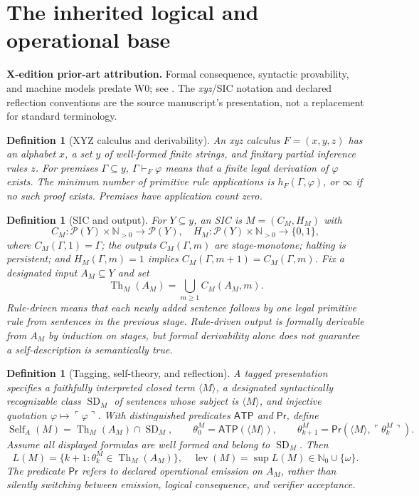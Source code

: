 \documentclass[11pt,letterpaper]{article}
\newcommand{\PriorArtNote}[1]{%
\par\smallskip\noindent\begin{minipage}{\linewidth}\small\color{black!85}%
\textbf{X-edition prior-art attribution.} #1\end{minipage}\par\smallskip}
\newtheorem{definition}[theorem]{Definition}
\newcommand{\thmset}{\operatorname{Th}}
\newcommand{\Self}{\operatorname{Self}}
\newcommand{\SD}{\operatorname{SD}}
\newcommand{\Prv}{\mathsf{Pr}}
\newcommand{\ATP}{\mathsf{ATP}}
\newcommand{\lev}{\operatorname{lev}}
\begin{document}
\section{The inherited logical and operational base}
\PriorArtNote{Formal consequence, syntactic provability, and machine models predate W0; see \cite{godel,lob,feferman}. The \emph{xyz}/SIC notation and declared reflection conventions are the source manuscript's presentation, not a replacement for standard terminology.}
\begin{definition}[XYZ calculus and derivability]\label{def:xyz}
An \emph{xyz calculus} $F=(x,y,z)$ has an alphabet $x$, a set $y$ of well-formed finite strings, and finitary partial inference rules $z$. For premises $\Gamma\subseteq y$, $\Gamma\vdash_F\varphi$ means that a finite legal derivation of $\varphi$ exists. The minimum number of primitive rule applications is $h_F(\Gamma,\varphi)$, or $\infty$ if no such proof exists. Premises have application count zero.
\end{definition}
\begin{definition}[SIC and output]\label{def:sic}
For $Y\subseteq y$, an SIC is $M=(C_M,H_M)$ with
\[
 C_M:\mathcal P(Y)\times\mathbb N_{>0}\longrightarrow\mathcal P(Y),\quad
 H_M:\mathcal P(Y)\times\mathbb N_{>0}\longrightarrow\{0,1\},
\]
where $C_M(\Gamma,1)=\Gamma$; the outputs $C_M(\Gamma,m)$ are stage-monotone; halting is persistent; and $H_M(\Gamma,m)=1$ implies $C_M(\Gamma,m+1)=C_M(\Gamma,m)$. Fix a designated input $A_M\subseteq Y$ and set
\[
\thmset_M(A_M)=\bigcup_{m\ge1}C_M(A_M,m).
\]
\emph{Rule-driven} means that each newly added sentence follows by one legal primitive rule from sentences in the previous stage. Rule-driven output is formally derivable from $A_M$ by induction on stages, but formal derivability alone does not guarantee a self-description is semantically true.
\end{definition}
\begin{definition}[Tagging, self-theory, and reflection]\label{def:reflection}
A tagged presentation specifies a faithfully interpreted closed term $\langle M\rangle$, a designated syntactically recognizable class $\SD_M$ of sentences whose subject is $\langle M\rangle$, and injective quotation $\varphi\mapsto\ulcorner\varphi\urcorner$. With distinguished predicates $\ATP$ and $\Prv$, define
\[
\Self_A(M)=\thmset_M(A_M)\cap\SD_M,\qquad
\theta^M_0=\ATP(\langle M\rangle),\qquad
\theta^M_{k+1}=\Prv(\langle M\rangle,\ulcorner\theta^M_k\urcorner).
\]
Assume all displayed formulas are well formed and belong to $\SD_M$. Then
\[
 L(M)=\{k+1:\theta^M_k\in\thmset_M(A_M)\},\quad
 \lev(M)=\sup L(M)\in\mathbb N_0\cup\{\omega\}.
\]
The predicate $\Prv$ refers to declared \emph{operational emission} on $A_M$, rather than silently switching between emission, logical consequence, and verifier acceptance.
\end{definition}
\end{document}
